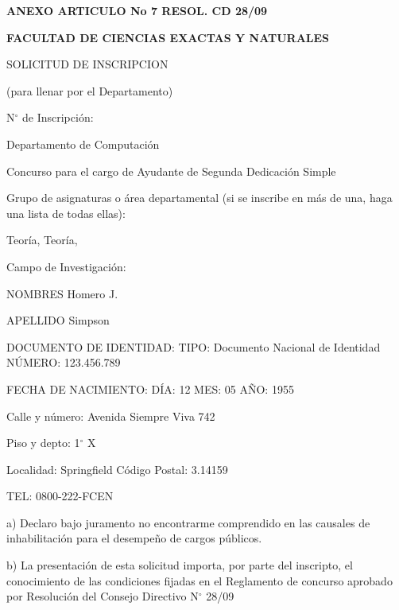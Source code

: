 \documentclass{article}
\newcommand{\cargo}[1]{\noindent Concurso para el cargo de {#1} \hspace{0.5cm} Dedicaci\'on Simple}
\newcommand{\areas}[3]{\noindent Grupo de asignaturas o \'area departamental (si se inscribe en m\'as de una, haga una lista de todas ellas):

\medskip

\noindent {#1}\def\temp{#2}\ifx\temp\empty \else, {#2}\fi\def\temp{#3}\ifx\temp\empty \else, {#3} \fi}
\newcommand{\apellido}[1]{\noindent APELLIDO {#1}}
\newcommand{\nombre}[1]{\noindent NOMBRES {#1}}
\newcommand{\dni}[1]{\noindent DOCUMENTO DE IDENTIDAD:  TIPO: Documento Nacional de Identidad \hspace{0.25cm} N\'UMERO: {#1}}
\newcommand{\fechaNacimiento}[3]{\noindent FECHA DE NACIMIENTO: D\'IA: {#1} \hspace{0.1cm} MES: {#2} {\hspace{0.1cm}} A\~NO: {#3}}
\newcommand{\domicilio}[5]{\noindent Calle y n\'umero: {#1}

\noindent Piso y depto: {#2}

\noindent Localidad: {#3} {\hspace{3cm}} C\'odigo Postal: {#4}

\noindent TEL: {#5}
}
\begin{document}
\begin{center}
{\bf ANEXO ARTICULO No 7 RESOL. CD 28/09}
\end{center}
{\bf \noindent FACULTAD DE CIENCIAS EXACTAS Y NATURALES

\noindent SOLICITUD DE INSCRIPCION}

\bigskip

\noindent (para llenar por el Departamento) 

\bigskip

\noindent N$^\circ$ de Inscripci\'on: \hdashrule{4cm}{0.5pt}{0.75pt} 

\medskip

\noindent Departamento de Computaci\'on

\cargo{Ayudante de Segunda}

\areas{Algoritmos}{Teor\'ia}{}

\medskip

\noindent \hdashrule{\linewidth}{0.5pt}{0.75pt}

\noindent Campo de Investigación:

\medskip

\noindent \hdashrule{\linewidth}{0.5pt}{0.75pt}

\medskip

\noindent \hdashrule{\linewidth}{0.5pt}{0.75pt}

\medskip

\noindent \hrulefill

\bigskip

\nombre{Homero J.}

\medskip

\apellido{Simpson}

\medskip

\dni{123.456.789}

\medskip

\fechaNacimiento{12}{05}{1955}

\bigskip

\domicilio{Avenida Siempre Viva 742}{1$^\circ$ X}{Springfield}{3.14159}{0800-222-FCEN}

\bigskip
\bigskip
\bigskip
\bigskip


\noindent a) Declaro bajo juramento no encontrarme comprendido en las causales de inhabilitaci\'on para el desempe\~no de cargos p\'ublicos.

\noindent b) La presentaci\'on de esta solicitud importa, por parte del inscripto, el conocimiento de las condiciones fijadas en el Reglamento de concurso aprobado por Resoluci\'on del Consejo Directivo N$^\circ$  28/09
\end{document}
